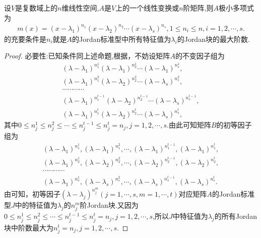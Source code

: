 \documentclass[../../main.tex]{subfiles}%
\begin{document}
\begin{proposition}\label{proposition:极小多项式对应Jordan标准型的最大块}
设$V$是复数域上的$n$维线性空间,$A$是$V$上的一个线性变换或$n$阶矩阵,则$A$极小多项式为
\begin{align*}
m(x)=\left( x-\lambda _1 \right) ^{n_1}\left( x-\lambda _2 \right)^{n_2}\cdots \left( x-\lambda _s \right) ^{n_s},1\leqslant n_i\leqslant n,i=1,2,\cdots ,s.
\end{align*}
的充要条件是$n_i$就是$A$的Jordan标准型中所有特征值为$\lambda_i$的Jordan块的最大阶数.
\end{proposition}
\begin{proof}

{\heiti 必要性:}已知条件同上述命题,根据，不妨设矩阵$A$的不变因子组为
\begin{gather*}
\left( \lambda -\lambda _1 \right) ^{n_{1}^{1}}\left( \lambda -\lambda _1 \right) ^{n_{2}^{1}}\cdots \left( \lambda -\lambda _1 \right) ^{n_{s}^{1}},
\\
\left( \lambda -\lambda _1 \right) ^{n_{1}^{2}}\left( \lambda -\lambda _2 \right) ^{n_{2}^{2}}\cdots \left( \lambda -\lambda _s \right) ^{n_{s}^{2}},
\\
\cdots \cdots \cdots \cdots 
\\
\left( \lambda -\lambda _1 \right) ^{n_{1}^{t-1}}\left( \lambda -\lambda _2 \right) ^{n_{2}^{t-1}}\cdots \left( \lambda -\lambda _s \right) ^{n_{s}^{t-1}},
\\
\left( \lambda -\lambda _1 \right) ^{n_{1}^{t}}\left( \lambda -\lambda _2 \right) ^{n_{2}^{t}}\cdots \left( \lambda -\lambda _s \right) ^{n_{s}^{t}},
\end{gather*}
其中$0 \leqslant n_j^1 \leqslant n_j^2 \leqslant \cdots \leqslant n_j^{t-1} \leqslant n_j^t = n_j, j = 1,2,\cdots,s$.由此可知矩阵$B$的初等因子组为
\begin{gather*}
\left( \lambda -\lambda _1 \right) ^{n_{1}^{1}},\left( \lambda -\lambda _1 \right) ^{n_{1}^{2}},\cdots ,\left( \lambda -\lambda _1 \right) ^{n_{1}^{t-1}},\left( \lambda -\lambda _1 \right) ^{n_{1}^{t}},
\\
\left( \lambda -\lambda _1 \right) ^{n_{2}^{1}},\left( \lambda -\lambda _2 \right) ^{n_{2}^{2}},\cdots ,\left( \lambda -\lambda _2 \right) ^{n_{2}^{t-1}},\left( \lambda -\lambda _2 \right) ^{n_{2}^{t}},
\\
\cdots \cdots \cdots \cdots 
\\
\left( \lambda -\lambda _1 \right) ^{n_{s}^{1}},\left( \lambda -\lambda _s \right) ^{n_{s}^{2}},\cdots ,\left( \lambda -\lambda _s \right) ^{n_{s}^{t-1}},\left( \lambda -\lambda _s \right) ^{n_{s}^{t}}.
\end{gather*}
由可知，初等因子$(\lambda - \lambda_j)^{n_j^m}(j = 1,\cdots,s,m = 1,\cdots,t)$对应矩阵$A$的Jordan标准型$J$中的特征值为$\lambda_j$的$n_j^m$阶Jordan块.又因为$0 \leqslant n_j^1 \leqslant n_j^2 \leqslant \cdots \leqslant n_j^{t-1} \leqslant n_j^t = n_j,j = 1,2,\cdots,s$,所以$J$中特征值为$\lambda_j$的所有Jordan块中阶数最大为$n_j^t = n_j,j = 1,2,\cdots,s$.


\end{proof}
\end{document}
